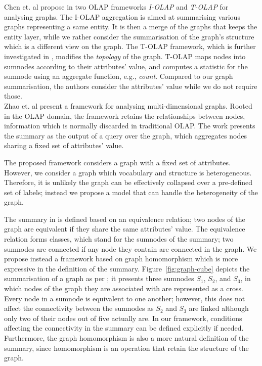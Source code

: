 Chen et. al propose in \cite{chen:icdm:2008} two OLAP frameworks \emph{I-OLAP} and \emph{T-OLAP} for analysing graphs. The I-OLAP aggregation is aimed at summarising various graphs representing a same entity. It is then a merge of the graphs that keeps the entity layer, while we rather consider the summarisation of the graph's structure which is a different view on the graph. The T-OLAP framework, which is further investigated in \cite{qu:dasfaa:2011}, modifies the \emph{topology} of the graph. T-OLAP maps nodes into sumnodes according to their attributes' value, and computes a statistic for the sumnode using an aggregate function, e.g., \emph{count}. Compared to our graph summarisation, the authors consider the attributes' value while we do not require those.\\

Zhao et. al \cite{zhao:sigmod:2011} present a framework for analysing multi-dimensional graphs. Rooted in the OLAP domain, the framework retains the relationships between nodes, information which is normally discarded in traditional OLAP. The work presents the summary as the output of a query over the graph, which aggregates nodes sharing a fixed set of attributes' value.

The proposed framework considers a graph with a fixed set of attributes. However, we consider a graph which vocabulary and structure is heterogeneous. Therefore, it is unlikely the graph can be effectively collapsed over a pre-defined set of labels; instead we propose a model that can handle the heterogeneity of the graph.

The summary in \cite{zhao:sigmod:2011} is defined based on an equivalence relation; two nodes of the graph are equivalent if they share the same attributes' value. The equivalence relation forms classes, which stand for the sumnodes of the summary; two sumnodes are connected if any node they contain are connected in the graph. We propose instead a framework based on graph homomorphism which is more expressive in the definition of the summary. Figure~\ref{fig:graph-cube} depicts the summarisation of a graph as per \cite{zhao:sigmod:2011}; it presents three sumnodes $S_1$, $S_2$, and $S_3$, in which nodes of the graph they are associated with are represented as a cross. Every node in a sumnode is equivalent to one another; however, this does not affect the connectivity between the sumnodes as $S_2$ and $S_3$ are linked although only two of their nodes out of five actually are. In our framework, conditions affecting the connectivity in the summary can be defined explicitly if needed. Furthermore, the graph homomorphism is also a more natural definition of the summary, since homomorphism is an operation that retain the structure of the graph.\\

